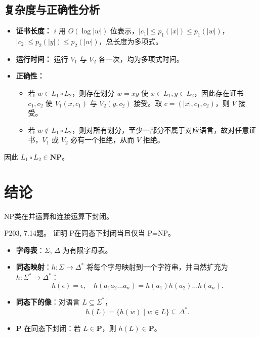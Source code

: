 \documentclass[11pt,addpoints,answers]{exam}
\begin{document}
\begin{questions}
\begin{solution}
    \subsection*{复杂度与正确性分析}
    \begin{itemize}
        \item \textbf{证书长度：} $i$ 用 $O(\log |w|)$ 位表示，$|c_1| \le p_1(|x|) \le p_1(|w|)$，$|c_2| \le p_2(|y|) \le p_2(|w|)$，总长度为多项式。
        \item \textbf{运行时间：} 运行 $V_1$ 与 $V_2$ 各一次，均为多项式时间。
        \item \textbf{正确性：}
            \begin{itemize}
                \item 若 $w \in L_1 \circ L_2$，则存在划分 $w = xy$ 使 $x \in L_1, y \in L_2$，因此存在证书 $c_1, c_2$ 使 $V_1(x,c_1)$ 与 $V_2(y,c_2)$ 接受。取 $c = (|x|, c_1, c_2)$，则 $V$ 接受。
                \item 若 $w \notin L_1 \circ L_2$，则对所有划分，至少一部分不属于对应语言，故对任意证书，$V_1$ 或 $V_2$ 必有一个拒绝，从而 $V$ 拒绝。
            \end{itemize}
    \end{itemize}
    
    因此 $L_1 \circ L_2 \in \mathbf{NP}$。
    
    \section*{结论}
    NP类在并运算和连接运算下封闭。
\end{solution}

\question P203, 7.14题。
证明 P在同态下封闭当且仅当 P=NP。
\begin{solution}

    \begin{itemize}
        \item \textbf{字母表}：$\Sigma$, $\Delta$ 为有限字母表。
        \item \textbf{同态映射}：$h: \Sigma \to \Delta^*$ 将每个字母映射到一个字符串，并自然扩充为 $h: \Sigma^* \to \Delta^*$：
            \[
            h(\epsilon) = \epsilon, \quad h(a_1 a_2 \dots a_n) = h(a_1) h(a_2) \dots h(a_n).
            \]
        \item \textbf{同态下的像}：对语言 $L \subseteq \Sigma^*$，
            \[
            h(L) = \{ h(w) \mid w \in L \} \subseteq \Delta^*.
            \]
        \item $\mathbf{P}$ 在同态下封闭：若 $L \in \mathbf{P}$，则 $h(L) \in \mathbf{P}$。
    \end{itemize}
    

\end{solution}
\end{questions}
\end{document}
